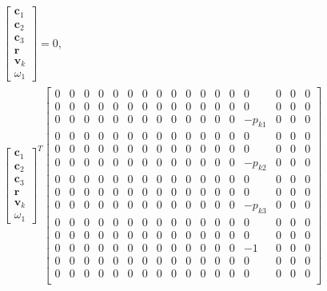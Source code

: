 \documentclass{article}
\begin{document}
\begin{align}
    \begin{bmatrix}
        \mathbf{c}_1 \\
        \mathbf{c}_2 \\
        \mathbf{c}_3 \\
        \mathbf{r} \\
        \mathbf{v}_k \\
        \omega_1
    \end{bmatrix} = 0, \\
    \begin{bmatrix}
        \mathbf{c}_1 \\
        \mathbf{c}_2 \\
        \mathbf{c}_3 \\
        \mathbf{r} \\
        \mathbf{v}_k \\
        \omega_1
    \end{bmatrix}^T 
    \begin{bmatrix}
        0 & 0 & 0 & 0 & 0 & 0 & 0 & 0 & 0 & 0 & 0 & 0 & 0 & 0 & 0 & 0 & 0 \\
        0 & 0 & 0 & 0 & 0 & 0 & 0 & 0 & 0 & 0 & 0 & 0 & 0 & 0 & 0 & 0 & 0 \\
        0 & 0 & 0 & 0 & 0 & 0 & 0 & 0 & 0 & 0 & 0 & 0 & 0 & -p_{k1} & 0 & 0 & 0 \\
        0 & 0 & 0 & 0 & 0 & 0 & 0 & 0 & 0 & 0 & 0 & 0 & 0 & 0 & 0 & 0 & 0 \\
        0 & 0 & 0 & 0 & 0 & 0 & 0 & 0 & 0 & 0 & 0 & 0 & 0 & 0 & 0 & 0 & 0 \\
        0 & 0 & 0 & 0 & 0 & 0 & 0 & 0 & 0 & 0 & 0 & 0 & 0 & -p_{k2} & 0 & 0 & 0 \\
        0 & 0 & 0 & 0 & 0 & 0 & 0 & 0 & 0 & 0 & 0 & 0 & 0 & 0 & 0 & 0 & 0 \\
        0 & 0 & 0 & 0 & 0 & 0 & 0 & 0 & 0 & 0 & 0 & 0 & 0 & 0 & 0 & 0 & 0 \\
        0 & 0 & 0 & 0 & 0 & 0 & 0 & 0 & 0 & 0 & 0 & 0 & 0 & -p_{k3} & 0 & 0 & 0 \\
        0 & 0 & 0 & 0 & 0 & 0 & 0 & 0 & 0 & 0 & 0 & 0 & 0 & 0 & 0 & 0 & 0 \\
        0 & 0 & 0 & 0 & 0 & 0 & 0 & 0 & 0 & 0 & 0 & 0 & 0 & 0 & 0 & 0 & 0 \\
        0 & 0 & 0 & 0 & 0 & 0 & 0 & 0 & 0 & 0 & 0 & 0 & 0 & -1 & 0 & 0 & 0 \\
        0 & 0 & 0 & 0 & 0 & 0 & 0 & 0 & 0 & 0 & 0 & 0 & 0 & 0 & 0 & 0 & 0 \\
        0 & 0 & 0 & 0 & 0 & 0 & 0 & 0 & 0 & 0 & 0 & 0 & 0 & 0 & 0 & 0 & 0 \\

\end{bmatrix}
\end{align}
\end{document}
